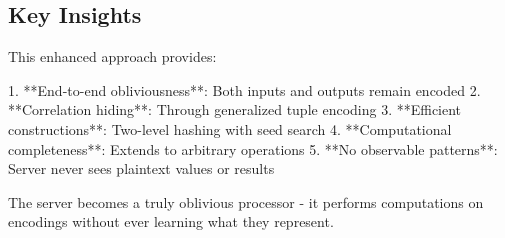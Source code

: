 \subsection{Key Insights}

This enhanced approach provides:

1. **End-to-end obliviousness**: Both inputs and outputs remain encoded
2. **Correlation hiding**: Through generalized tuple encoding
3. **Efficient constructions**: Two-level hashing with seed search
4. **Computational completeness**: Extends to arbitrary operations
5. **No observable patterns**: Server never sees plaintext values or results

The server becomes a truly oblivious processor - it performs computations on encodings without ever learning what they represent.